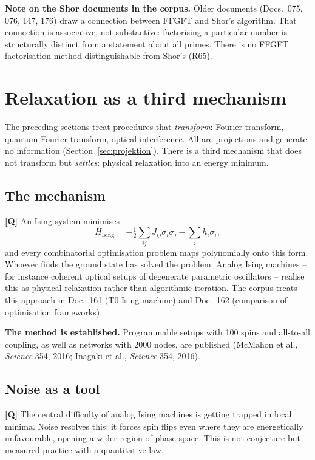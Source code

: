\textbf{Note on the Shor documents in the corpus.} Older documents
(Docs.~075, 076, 147, 176) draw a connection between FFGFT and Shor's
algorithm. That connection is associative, not substantive: factorising a
particular number is structurally distinct from a statement about all
primes. There is no FFGFT factorisation method distinguishable from
Shor's (R65).

\section{Relaxation as a third mechanism}
\label{sec:relaxation}

The preceding sections treat procedures that \emph{transform}: Fourier
transform, quantum Fourier transform, optical interference. All are
projections and generate no information (Section~\ref{sec:projektion}).
There is a third mechanism that does not transform but \emph{settles}:
physical relaxation into an energy minimum.

\subsection{The mechanism}

\textbf{[Q]} An Ising system minimises
\begin{equation}
  H_{\text{Ising}} = -\tfrac12 \sum_{ij} J_{ij}\sigma_i\sigma_j
  - \sum_i h_i \sigma_i ,
\end{equation}
and every combinatorial optimisation problem maps polynomially onto this
form. Whoever finds the ground state has solved the problem. Analog Ising
machines -- for instance coherent optical setups of degenerate parametric
oscillators -- realise this as physical relaxation rather than algorithmic
iteration. The corpus treats this approach in Doc.~161 (T0 Ising machine)
and Doc.~162 (comparison of optimisation frameworks).

\textbf{The method is established.} Programmable setups with 100 spins and
all-to-all coupling, as well as networks with 2000 nodes, are published
(McMahon et al., \emph{Science} 354, 2016; Inagaki et al., \emph{Science}
354, 2016).

\subsection{Noise as a tool}

\textbf{[Q]} The central difficulty of analog Ising machines is getting
trapped in local minima. Noise resolves this: it forces spin flips even
where they are energetically unfavourable, opening a wider region of phase
space. This is not conjecture but measured practice with a quantitative
law.

